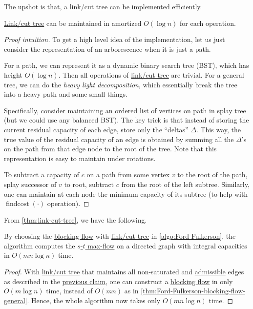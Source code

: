 The upshot is that, a \hyperref[def:link-cut-tree]{link/cut tree} can be implemented efficiently.

\begin{theorem}\label{thm:link-cut-tree}
	\hyperref[def:link-cut-tree]{Link/cut tree} can be maintained in amortized \(O(\log n)\) for each operation.
\end{theorem}
\begin{proof}[Proof intuition]
	To get a high level idea of the implementation, let us just consider the representation of an arborescence when it is just a path.
	\begin{intuition}
		For a path, we can represent it as a dynamic binary search tree (BST), which has height \(O(\log n)\). Then all operations of \hyperref[def:link-cut-tree]{link/cut tree} are trivial. For a general tree, we can do the \emph{heavy light decomposition}, which essentially break the tree into a heavy path and some small things.
	\end{intuition}
	Specifically, consider maintaining an ordered list of vertices on path in \href{https://en.wikipedia.org/wiki/Splay_tree}{splay tree} (but we could use any balanced BST). The key trick is that instead of storing the current residual capacity of each edge, store only the ``deltas'' \(\Delta \). This way, the true value of the residual capacity of an edge is obtained by summing all the \(\Delta \)'s on the path from that edge node to the root of the tree. Note that this representation is easy to maintain under rotations.

	To subtract a capacity of \(c\) on a path from some vertex \(v\) to the root of the path, splay successor of \(v\) to root, subtract \(c\) from the root of the left subtree. Similarly, one can maintain at each node the minimum capacity of its subtree (to help with \(\operatorname{findcost}(\cdot) \) operation).
\end{proof}

From \autoref{thm:link-cut-tree}, we have the following.

\begin{theorem}\label{thm:Ford-Fulkerson-link-cut-tree}
	By choosing the \hyperref[def:blocking-flow]{blocking flow} with \hyperref[def:link-cut-tree]{link/cut tree} in \autoref{algo:Ford-Fulkerson}, the algorithm computes the \hyperref[prb:s-t-max-flow]{\(s\)-\(t\) max-flow} on a directed graph with integral capacities in \(O(mn \log n)\) time.
\end{theorem}
\begin{proof}
	With \hyperref[def:link-cut-tree]{link/cut tree} that maintains all non-saturated and \hyperref[def:admissible]{admissible} edges as described in the \hyperref[clm:adaptive-DFS-link-cut-tree]{previous claim}, one can construct a \hyperref[def:blocking-flow]{blocking flow} in only \(O(m \log n)\) time, instead of \(O(mn)\) as in \autoref{thm:Ford-Fulkerson-blocking-flow-general}. Hence, the whole algorithm now takes only \(O(mn \log n)\) time.
\end{proof}